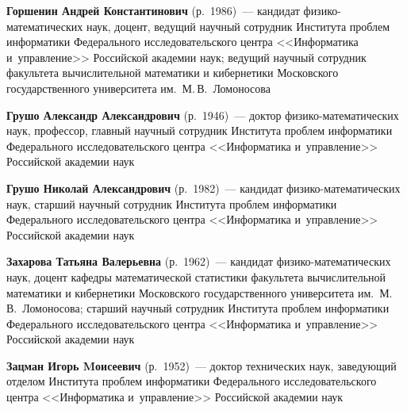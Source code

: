 \begin{multicols}{2}
\vspace*{3pt}

\noindent
\textbf{Горшенин Андрей Константинович} (р.\ 1986)~--- 
кандидат фи\-зи\-ко-ма\-те\-ма\-ти\-че\-ских наук, доцент, ведущий научный сотрудник 
Института проб\-лем информатики Федерального исследователь\-ского цент\-ра 
<<Информатика и~управ\-ле\-ние>>\linebreak
 Российской академии наук; 
ведущий научный сотрудник факультета вычислительной математики и кибернетики 
Московского государственного университета им.\ М.\,В.~Ломоносова


\columnbreak

\noindent
\textbf{Грушо Александр Александрович} (р.\ 1946)~--- 
доктор фи\-зи\-ко-ма\-те\-ма\-ти\-че\-ских наук, профессор, 
главный научный со\-труд\-ник Института проб\-лем информатики Федерального 
исследовательского цент\-ра <<Информатика и~управ\-ле\-ние>>
 Российской академии наук

\vspace*{3pt}

\noindent
\textbf{Грушо Николай Александрович} (р.\ 1982)~--- 
кандидат фи\-зи\-ко-ма\-те\-ма\-ти\-че\-ских наук, старший научный со\-труд\-ник 
Института проб\-лем информатики Федерального исследовательского центра 
<<Информатика и~управ\-ле\-ние>> Российской академии наук


\vspace*{3pt}

\noindent
\textbf{Захарова Татьяна Валерьевна} (р.\ 1962)~--- 
кандидат фи\-зи\-ко-ма\-те\-ма\-ти\-че\-ских наук, доцент кафедры 
математической статистики факультета вычислительной математики и кибернетики 
Московского\linebreak 
государственного университета им.\ М.\,В.~Ло\-мо\-носова; 
старший научный сотрудник Института\linebreak
 проб\-лем информатики Федерального
 исследовательского центра <<Информатика и~управ\-ле\-ние>> Российской академии наук

\vspace*{3pt}
 
\noindent
\textbf{Зацман Игорь Mоисеевич} (р.\ 1952)~--- 
доктор тех\-нических наук, заведующий отделом Института проб\-лем информатики 
Федерального исследовательского цент\-ра <<Информатика и~управ\-ле\-ние>>
 Российской академии наук

\vspace*{3pt}


\end{multicols}
